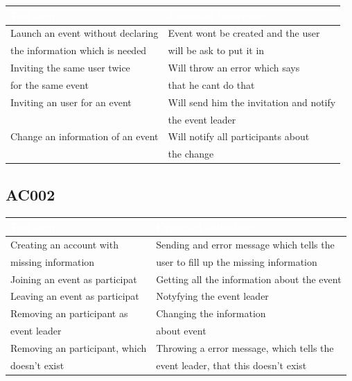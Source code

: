\documentclass[12pt]{article}
\theoremstyle{definition}
\begin{document}
\begin{tabular}{|l|l|}
\hline 
\cellcolor[gray]{0.5}\textcolor{white}{Test step} & \cellcolor[gray]{0.5}\textcolor{white}{Expected behaviour} \\ \hline
Launch an event without declaring & Event wont be created and the user \\ the information which is needed & will be ask to put it in \\ \hline
Inviting the same user twice & Will throw an error which says \\ for the same event & that he cant do that \\ \hline
Inviting an user for an event & Will send him the invitation and notify \\  & the event leader\\ \hline
Change an information of an event & Will notify all participants about \\ & the change \\ \hline
\end{tabular} 

\subsection{AC002}

\begin{tabular}{|l|l|}
\hline 
\cellcolor[gray]{0.5}\textcolor{white}{Test step} & \cellcolor[gray]{0.5}\textcolor{white}{Expected behaviour} \\ \hline
Creating an account with & Sending and error message which tells the \\ missing information & user to fill up the missing information \\ \hline
Joining an event as participat & Getting all the information about the event \\ \hline
Leaving an event as participat & Notyfying the event leader \\ \hline
Removing an participant as & Changing the information \\ event leader & about event \\ \hline
Removing an participant, which & Throwing a error message, which tells the \\ doesn't exist & event leader, that this doesn't exist \\ \hline



\end{tabular}



\pagebreak
\end{document}

